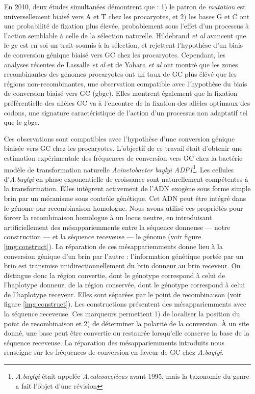 En 2010, deux études simultanées\cite{hildebrand_evidence_2010,
  hershberg_evidence_2010} démontrent que : 1) le patron de \emph{mutation} est
universellement biaisé vers A et T chez les procaryotes, et 2) les bases G et C
ont une probabilité de fixation plus élevée, probablement sous l'effet d'un
processus à l'action semblable à celle de la sélection naturelle. Hildebrand
\emph{et al} avancent que le \ac{gc} est en soi un trait soumis à la sélection,
et rejettent l'hypothèse d'un biais de conversion génique biaisé vers GC chez
les procaryotes. Cependant, les analyses récentes de Lassalle \emph{et al}
\cite{lassalle_gc-content_2015} et de Yahara \emph{et
  al}\cite{yahara_landscape_2016} ont montré que les zones recombinantes des
génomes procaryotes ont un taux de GC plus élévé que les régions
non-recombinantes, une observation compatible avec l'hypothèse du biais de
conversion biaisé vers GC (\ac{gbgc}). Elles montrent également que la fixation
préférentielle des allèles GC va à l'encontre de la fixation des allèles
optimaux des codons, une signature caractéristique de l'action d'un processus
non adaptatif tel que le \ac{gbgc}.


Ces observations sont compatibles avec l'hypothèse d'une conversion génique
biaisée vers GC chez les procaryotes. L'objectif de ce travail était d'obtenir
une estimation expérimentale des fréquences de conversion vers GC chez la
bactérie modèle de transformation naturelle \emph{Acinetobacter baylyi
  ADP1}\footnote{\emph{A.baylyi} était appelée \emph{A.calcoaceticus} avant
  1995, mais la taxonomie du genre a fait l'objet d'une
  révision\cite{euzeby_list_1997}}. Les cellules d'\emph{A.baylyi} en phase
exponentielle de croissance sont naturellement compétentes à la transformation.
Elles intègrent activement de l'ADN exogène sous forme simple brin par un
mécanisme sous contrôle génétique. Cet ADN peut être intégré dans le génome par
recombinaison homologue. Nous avons utilisé ces propriétés pour forcer la
recombinaison homologue à un locus neutre, en introduisant artificiellement des
mésappariemments entre la séquence donneuse --- notre construction --- et la
séquence receveuse --- le génome (voir figure \ref{img:construct}). La
réparation de ces mésappariemments donne lieu à la conversion génique d'un brin
par l'autre : l'information génétique portée par un brin est transmise
unidirectionnellement du brin donneur au brin receveur. On distingue donc la
région convertie, dont le génotype correspond à celui de l'haplotype donneur, de
la région conservée, dont le génotype correspond à celui de l'haplotype
receveur. Elles sont séparées par le point de recombinaison (voir figure
\ref{img:construct}). Les constructions présentent des mésappariemments avec la
séquence receveuse. Ces marqueurs permettent 1) de localiser la position du
point de recombinaison et 2) de déterminer la polarité de la conversion. À un
site donné, une base peut être convertie ou restaurée lorsqu'elle conserve la
base de la séquence receveuse. La réparation des mésappariemments introduits
nous renseigne sur les fréquences de conversion en faveur de GC chez
\emph{A.baylyi}.


\newpage
